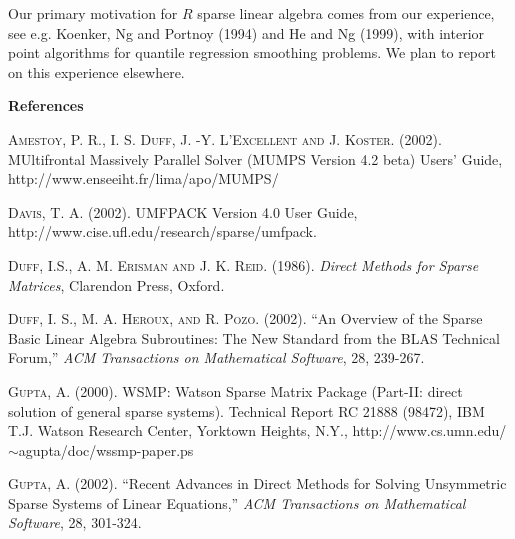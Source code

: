 \documentclass{article}
\begin{document}
Our primary motivation for $R$ sparse linear algebra comes from
our experience, see  e.g. Koenker, Ng and Portnoy (1994) and He and Ng (1999),
with interior point algorithms for quantile regression  smoothing problems.  
We plan to report on this experience elsewhere.


\begin{center}
{\Large{\bf References}}
\end{center}



\textsc{Amestoy, P. R., I. S. Duff, J. -Y. L'Excellent {\small and} J. Koster.} (2002).
MUltifrontal Massively Parallel Solver (MUMPS Version 4.2 beta) Users' Guide,
http://www.enseeiht.fr/lima/apo/MUMPS/

\textsc{Davis, T. A.} (2002). UMFPACK Version 4.0 User Guide,
\newline
http://www.cise.ufl.edu/research/sparse/umfpack.

\textsc{Duff, I.S., A. M. Erisman {\small and} J. K. Reid.} (1986). \textit{Direct
Methods for Sparse Matrices}, Clarendon Press, Oxford.

\textsc{Duff, I. S., M. A. Heroux, {\small and} R. Pozo.} (2002).
``An Overview of the Sparse Basic Linear Algebra Subroutines: The
New Standard from the BLAS Technical Forum,'' \emph{ACM Transactions
on Mathematical Software}, 28, 239-267.


\textsc{Gupta, A.} (2000). WSMP: Watson Sparse Matrix Package (Part-II:
direct solution of general sparse systems). Technical Report RC 21888 (98472),
IBM T.J. Watson Research Center, Yorktown Heights, N.Y., 
http://www.cs.umn.edu/
\newline
$\sim$agupta/doc/wssmp-paper.ps

\textsc{Gupta, A.} (2002). ``Recent Advances in Direct Methods for
Solving Unsymmetric Sparse Systems of Linear Equations,'' \emph{ACM 
Transactions on Mathematical Software}, 28, 301-324.
\end{document}
